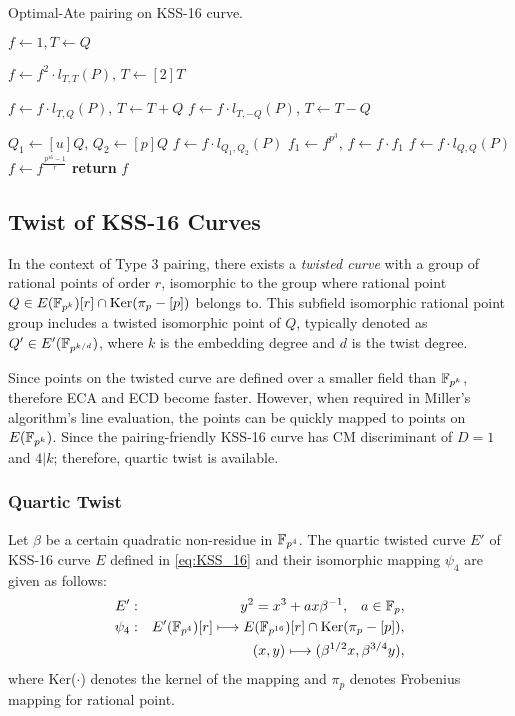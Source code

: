 \begin{algorithm}[ht]
	\caption{Optimal-Ate pairing on KSS-16 curve.}
	\label{indo_kss16_optimal_algo}
	\DontPrintSemicolon
	
	
	$f \leftarrow 1,T \leftarrow Q$\;
	 {
		$f\leftarrow f^2\cdot l_{T,T}(P)$, $T\leftarrow [2]T$\;
		
		 {
			$f\leftarrow f\cdot l_{T,Q}(P)$, $T\leftarrow T+Q$}
		 {
			$f\leftarrow f\cdot l_{T,-Q}(P)$, $T\leftarrow T-Q$}}
	
	$Q_1\leftarrow [u]Q$, $Q_2\leftarrow [p]Q$\;
	$f\leftarrow f\cdot l_{Q_1,Q_2}(P)$\;
	$f_1\leftarrow f^{p^3}$, $f\leftarrow f\cdot f_1$\;
	$f\leftarrow f\cdot l_{Q,Q}(P)$\;
	$f\leftarrow f^{\frac{p^{16}-1}{r}}$\;
	{\bf return} $f$\;
\end{algorithm}
\vspace{-0.6em}


\subsection{Twist of KSS-16 Curves} 
In the context of  Type 3 pairing, there exists a \textit{twisted curve} with a group of rational points of order $r$, isomorphic to the group where rational point $Q \in  E({\mathbb{F}}_{p^{k}}) [r] \cap \text{Ker}(\pi_p - [p])$  belongs to. This subfield isomorphic rational point group includes a twisted isomorphic point of $Q$, typically denoted as $Q' \in E'(\mathbb{F}_{p^{k/d}})$, where $k$ is the embedding degree and $d$ is the twist degree.  

Since points on the twisted curve are defined over a smaller field than $\mathbb{F}_{p^k}$, therefore ECA and ECD become faster. 
However, when required in Miller's algorithm's line evaluation, the points can be quickly mapped to points on $E(\mathbb{F}_{p^k} )$. 
Since the pairing-friendly KSS-16 \cite{EPRINT:KacSchSco07} curve has CM discriminant of $D = 1$ and $4|k$; therefore, quartic twist is available.
\subsubsection{Quartic Twist} 
\label{sec:ch:indo:Quartic_twist}
Let $\beta$ be a certain quadratic non-residue in $\mathbb{F}_{p^4}$.  The quartic twisted curve $E'$ of KSS-16  curve $E$ defined in \eqref{eq:KSS_16} and  their isomorphic mapping $\psi_4$ are given as follows:
\begin{eqnarray}
E'&:&y^2=x^3+ax\beta^{-1},\;\;\;a\in{\mathbb{F}}_{p}, \nonumber\\
\psi_4&:&E'(\mathbb{F}_{p^4})[r] \longmapsto E(\mathbb{F}_{p^{16}})[r]\cap {\rm Ker}(\pi_p-[p]),\nonumber\\
&&(x,y)\longmapsto (\beta^{1/2}x,\beta^{3/4}y),\label{kss16_quartic_twisted_map}
\end{eqnarray}
where Ker($\cdot$) denotes the kernel of the mapping and $\pi_p$ denotes Frobenius mapping  for rational point.

